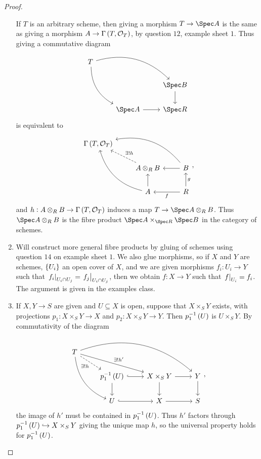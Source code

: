\begin{proof}
\begin{enumerate}[leftmargin=0.5in, label=Step \arabic*.]
If $ T $ is an arbitrary scheme, then giving a morphism $ T \to \Spec A $ is the same as giving a morphism $ A \to \Gamma\br{T, \OOO_T} $, by question $ 12 $, example sheet $ 1 $. Thus giving a commutative diagram
$$
\begin{tikzcd}
T \arrow[bend left=30]{drr} \arrow[bend right=30]{ddr} & & \\
& & \Spec B \arrow{d} \\
& \Spec A \arrow{r} & \Spec R
\end{tikzcd}
$$
is equivalent to
$$
\begin{tikzcd}
\Gamma\br{T, \OOO_T} & & \\
& A \otimes_R B \arrow[dashed]{ul}[swap]{\exists !h} & B \arrow[bend right=30]{ull} \arrow{l} \\
& A \arrow[bend left=30]{uul} \arrow{u} & R \arrow{u}[swap]{g} \arrow{l}{f}
\end{tikzcd},
$$
and $ h : A \otimes_R B \to \Gamma\br{T, \OOO_T} $ induces a map $ T \to \Spec A \otimes_R B $. Thus $ \Spec A \otimes_R B $ is the fibre product $ \Spec A \times_{\Spec R} \Spec B $ in the category of schemes.
\item Will construct more general fibre products by gluing of schemes using question $ 14 $ on example sheet $ 1 $. We also glue morphisms, so if $ X $ and $ Y $ are schemes, $ \cbr{U_i} $ an open cover of $ X $, and we are given morphisms $ f_i : U_i \to Y $ such that $ \left. f_i \right|_{U_i \cap U_j} = \left. f_j \right|_{U_i \cap U_j} $, then we obtain $ f : X \to Y $ such that $ \left. f \right|_{U_i} = f_i $. The argument is given in the examples class.
\item If $ X, Y \to S $ are given and $ U \subseteq X $ is open, suppose that $ X \times_S Y $ exists, with projections $ p_1 : X \times_S Y \to X $ and $ p_2 : X \times_S Y \to Y $. Then $ p_1^{-1}\br{U} $ is $ U \times_S Y $. By commutativity of the diagram
$$
\begin{tikzcd}
T \arrow[dashed]{dr}[swap]{\exists! h} \arrow{drr}{\exists !h'} \arrow[bend left=30]{drrr} \arrow[bend right=30]{ddr} & & & \\
& p_1^{-1}\br{U} \arrow[hookrightarrow]{r} \arrow{d} & X \times_S Y \arrow{r} \arrow{d} & Y \arrow{d} \\
& U \arrow[hookrightarrow]{r} & X \arrow{r} & S
\end{tikzcd},
$$
the image of $ h' $ must be contained in $ p_1^{-1}\br{U} $. Thus $ h' $ factors through $ p_1^{-1}\br{U} \hookrightarrow X \times_S Y $ giving the unique map $ h $, so the universal property holds for $ p_1^{-1}\br{U} $.

\end{enumerate}
\end{proof}
